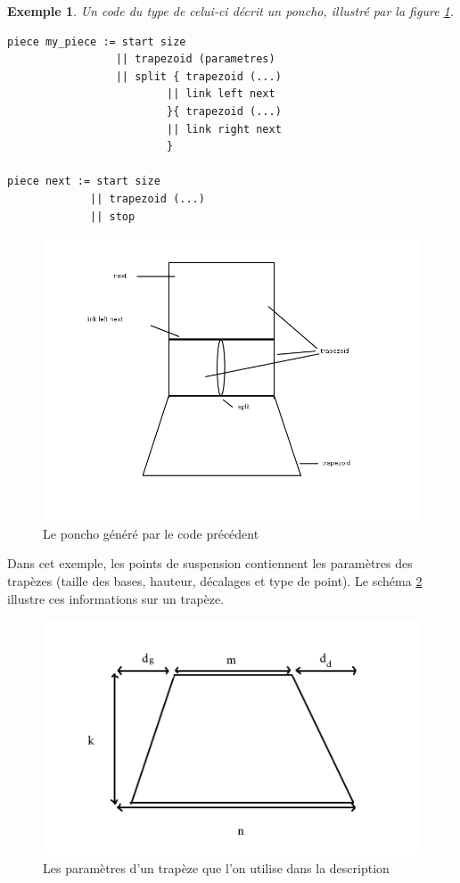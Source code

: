 \documentclass{article}
\newtheorem{ex}{Exemple}
\begin{document}
\begin{ex}
   Un code du type de celui-ci décrit un poncho, illustré par la figure \ref{poncho}.
\end{ex}

\begin{lstlisting}
piece my_piece := start size
                 || trapezoid (parametres) 
                 || split { trapezoid (...)
                         || link left next
                         }{ trapezoid (...)
                         || link right next
                         }

piece next := start size
             || trapezoid (...)
             || stop
\end{lstlisting}

\begin{figure}[!ht]
  \centering
  \includegraphics[scale=0.4]{../img/poncho.png}
  \caption{Le poncho généré par le code précédent}
  \label{poncho}
\end{figure}


Dans cet exemple, les points de suspension contiennent les paramètres des trapèzes (taille des bases, hauteur, décalages et type de point). Le schéma \ref{trapeze} illustre ces informations sur un trapèze.

\begin{figure}[!ht]
  \centering
  \includegraphics[scale=0.5]{../img/trapeze.jpg}
  \caption{Les paramètres d'un trapèze que l'on utilise dans la description}
  \label{trapeze}
\end{figure}
\end{document}
